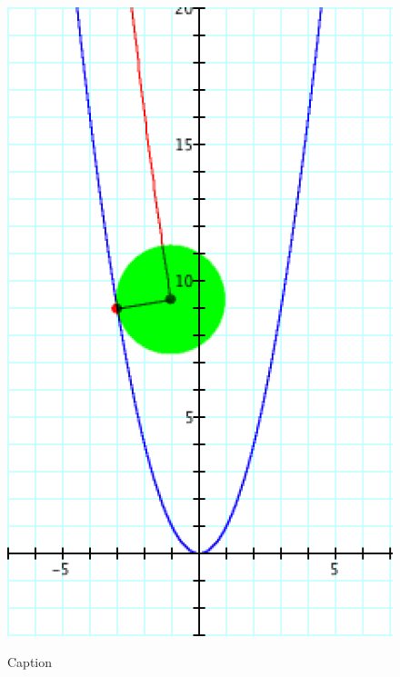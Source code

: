 {\begin{figure}[H]
    \begin{minipage}[b]{0.5\linewidth}
      \centering
      \label{crunch:4}
      \includegraphics[width=\fw, height=\fh, keepaspectratio]{img/09-crunch/04.png}
      \caption{Caption}
      \vspace{4ex}
    \end{minipage} %
  \end{figure}

}

